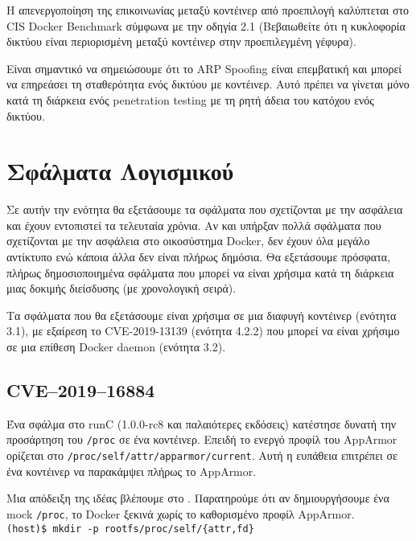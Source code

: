 Η απενεργοποίηση της επικοινωνίας μεταξύ κοντέινερ από προεπιλογή καλύπτεται στο
\textlatin{CIS Docker Benchmark} σύμφωνα με την οδηγία 2.1 (Βεβαιωθείτε ότι η
κυκλοφορία δικτύου είναι περιορισμένη μεταξύ κοντέινερ στην προεπιλεγμένη
γέφυρα).

Είναι σημαντικό να σημειώσουμε ότι το \textlatin{ARP Spoofing} είναι
επεμβατική και μπορεί να επηρεάσει τη σταθερότητα ενός δικτύου με
κοντέινερ. Αυτό πρέπει να γίνεται μόνο κατά τη διάρκεια ενός
\textlatin{penetration testing} με τη ρητή άδεια του κατόχου ενός δικτύου.

\section{Σφάλματα Λογισμικού}

Σε αυτήν την ενότητα θα εξετάσουμε τα σφάλματα που σχετίζονται με την ασφάλεια
και έχουν εντοπιστεί τα τελευταία χρόνια. Αν και υπήρξαν πολλά σφάλματα που
σχετίζονται με την ασφάλεια στο οικοσύστημα \textlatin{Docker}, δεν έχουν όλα
μεγάλο αντίκτυπο ενώ κάποια άλλα δεν είναι πλήρως δημόσια. Θα εξετάσουμε
πρόσφατα, πλήρως δημοσιοποιημένα σφάλματα που μπορεί να είναι χρήσιμα κατά τη
διάρκεια μιας δοκιμής διείσδυσης (με χρονολογική σειρά).

Τα σφάλματα που θα εξετάσουμε είναι χρήσιμα σε μια διαφυγή κοντέινερ (ενότητα
3.1), με εξαίρεση το \textlatin{CVE-2019-13139} (ενότητα 4.2.2) που μπορεί να
είναι χρήσιμο σε μια επίθεση \textlatin{Docker daemon} (ενότητα 3.2).

\subsection{\textlatin{CVE–2019–16884}}

Ένα σφάλμα στο \textlatin{runC (1.0.0-rc8} και παλαιότερες εκδόσεις) κατέστησε
δυνατή την προσάρτηση του \texttt{\textlatin{/proc}} σε ένα κοντέινερ. Επειδή το
ενεργό προφίλ του \textlatin{AppArmor} ορίζεται στο
\texttt{\textlatin{/proc/self/attr/apparmor/current}}. Αυτή η ευπάθεια επιτρέπει
σε ένα κοντέινερ να παρακάμψει πλήρως το \textlatin{AppArmor}.

Μια απόδειξη της ιδέας βλέπουμε στο \cite{CVE-2019-16884-Github}. Παρατηρούμε
ότι αν δημιουργήσουμε ένα \textlatin{mock} \texttt{\textlatin{/proc}}, το
\textlatin{Docker} ξεκινά χωρίς το καθορισμένο προφίλ \textlatin{AppArmor}.\\

\texttt{\textlatin{(host)\$ mkdir -p rootfs/proc/self/\{attr,fd\}}}

